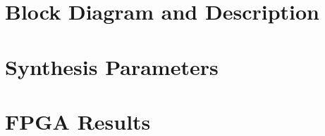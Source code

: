 \documentclass{../../submodules/TEX/document/ug/ug}
\begin{document}
\section{\textcolor[rgb]{0,0,0}{Block Diagram and Description}}

\clearpage

\section{\textcolor[rgb]{0,0,0}{Synthesis Parameters}}





\section{\textcolor[rgb]{0,0,0}{FPGA Results}}



%
%
\end{document}
